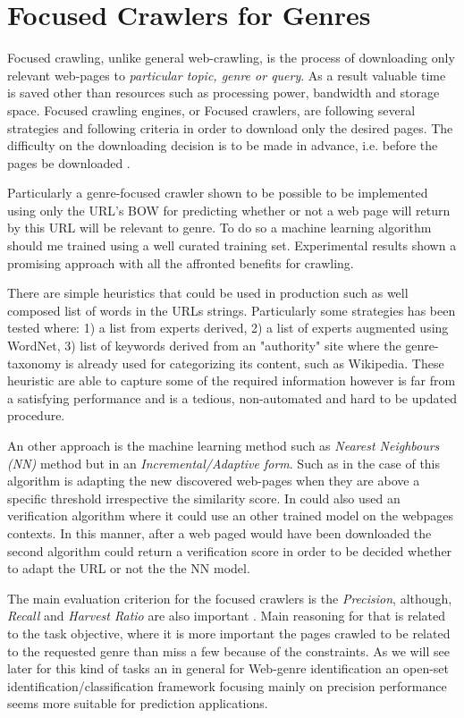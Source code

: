 \section{Focused Crawlers for Genres}\label{chap:relevant_work:sec:focused_crawlers}
Focused crawling, unlike general web-crawling, is the process of downloading only relevant web-pages to \textit{particular topic, genre or query}. As a result valuable time is saved other than resources such as processing power, bandwidth and storage space. Focused crawling engines, or Focused crawlers, are following several strategies and following criteria in order to download only the desired pages. The difficulty on the downloading decision is to be made in advance, i.e. before the pages be downloaded \parencite{priyatam2013don_URL} . 
 
Particularly a genre-focused crawler shown to be possible to be implemented using only the URL's BOW for predicting whether or not a web page will return by this URL will be relevant to genre. To do so a machine learning algorithm should me trained using a well curated training set. Experimental results shown a promising approach with all the affronted benefits for crawling.

There are simple heuristics that could be used in production such as well composed list of words in the URLs strings. Particularly some strategies has been tested where: 1) a list from experts derived, 2) a list of experts augmented using WordNet, 3) list of keywords derived from an "authority" site where the genre-taxonomy is already used for categorizing its content, such as Wikipedia. These heuristic are able to capture some of the required information however is far from a satisfying performance and is a tedious, non-automated and hard to be updated procedure.

An other approach is the machine learning method such as \textit{Nearest Neighbours (NN)} method but in an \textit{Incremental/Adaptive form}. Such as in the case of \parencite{jebari2015combination} this algorithm is adapting the new discovered web-pages when they are above a specific threshold irrespective the similarity score. In could also used an verification algorithm where it could use an other trained model on the webpages contexts. In this manner, after a web paged would have been downloaded the second algorithm could return a verification score in order to be decided whether to adapt the URL or not the the NN model. 

 The main evaluation criterion for the focused crawlers is the \textit{Precision}, although, \textit{Recall} and \textit{Harvest Ratio} are also important \parencite{priyatam2013don_URL}. Main reasoning for that is related to the task objective, where it is more important the pages crawled to be related to the requested genre than miss a few because of the constraints. As we will see later for this kind of tasks an in general for Web-genre identification an open-set identification/classification framework focusing mainly on precision performance seems more suitable for prediction applications. 
 

